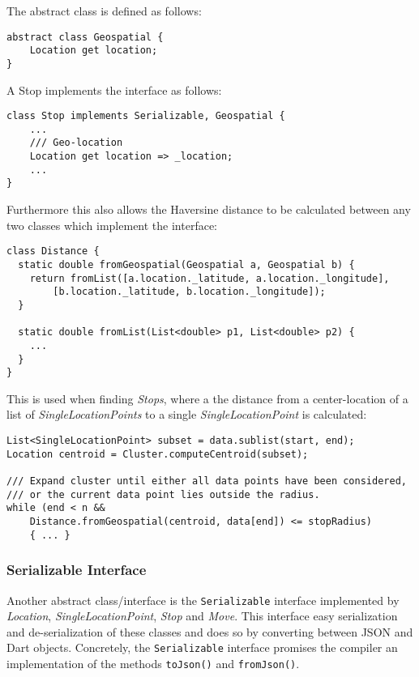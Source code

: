 The abstract class is defined as follows:
\begin{verbatim}
abstract class Geospatial {
    Location get location;
}
\end{verbatim}

A Stop implements the interface as follows:
\begin{verbatim}
class Stop implements Serializable, Geospatial { 
    ...
    /// Geo-location
    Location get location => _location;
    ...
}
\end{verbatim}

Furthermore this also allows the Haversine distance to be calculated between any two classes which implement the interface:

\begin{verbatim}
class Distance {
  static double fromGeospatial(Geospatial a, Geospatial b) {
    return fromList([a.location._latitude, a.location._longitude],
        [b.location._latitude, b.location._longitude]);
  }

  static double fromList(List<double> p1, List<double> p2) {
    ...
  }
}
\end{verbatim}

This is used when finding \textit{Stops}, where a the distance from a center-location of a list of \textit{SingleLocationPoints} to a single \textit{SingleLocationPoint} is calculated:

\begin{verbatim}
List<SingleLocationPoint> subset = data.sublist(start, end);
Location centroid = Cluster.computeCentroid(subset);

/// Expand cluster until either all data points have been considered,
/// or the current data point lies outside the radius.
while (end < n && 
    Distance.fromGeospatial(centroid, data[end]) <= stopRadius) 
    { ... }
\end{verbatim}

\subsubsection{Serializable Interface}
Another abstract class/interface is the \verb|Serializable| interface implemented by \textit{Location}, \textit{SingleLocationPoint}, \textit{Stop} and \textit{Move}. This interface easy serialization and de-serialization of these classes and does so by converting between JSON and Dart objects. Concretely, the \verb|Serializable| interface promises the compiler an implementation of the methods \verb|toJson()| and \verb|fromJson()|.

